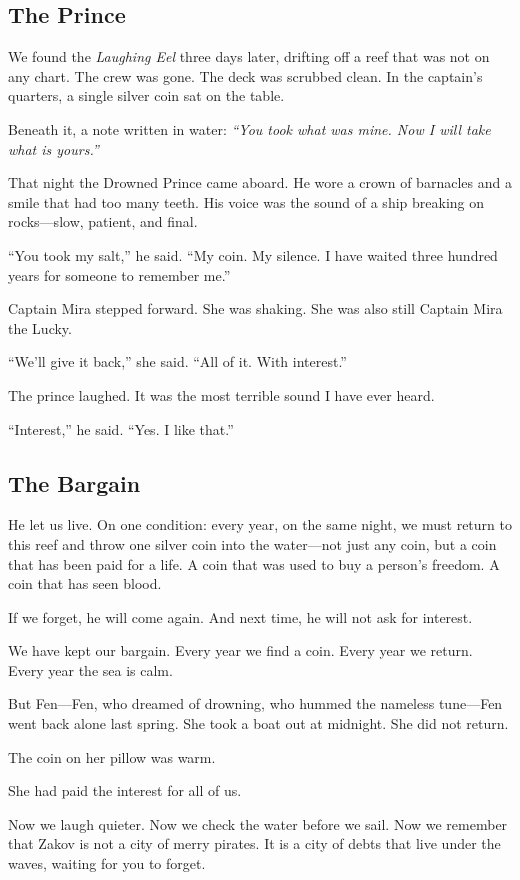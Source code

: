 \documentclass[12pt]{article}
\begin{document}
\subsection*{The Prince}
We found the \textit{Laughing Eel} three days later, drifting off a reef that was not on any chart. The crew was gone. The deck was scrubbed clean. In the captain’s quarters, a single silver coin sat on the table.

Beneath it, a note written in water: \textit{“You took what was mine. Now I will take what is yours.”}

That night the Drowned Prince came aboard. He wore a crown of barnacles and a smile that had too many teeth. His voice was the sound of a ship breaking on rocks—slow, patient, and final.

“You took my salt,” he said. “My coin. My silence. I have waited three hundred years for someone to remember me.”

Captain Mira stepped forward. She was shaking. She was also still Captain Mira the Lucky.

“We’ll give it back,” she said. “All of it. With interest.”

The prince laughed. It was the most terrible sound I have ever heard.

“Interest,” he said. “Yes. I like that.”

\subsection*{The Bargain}
He let us live. On one condition: every year, on the same night, we must return to this reef and throw one silver coin into the water—not just any coin, but a coin that has been paid for a life. A coin that was used to buy a person's freedom. A coin that has seen blood.

If we forget, he will come again. And next time, he will not ask for interest.

We have kept our bargain. Every year we find a coin. Every year we return. Every year the sea is calm.

But Fen—Fen, who dreamed of drowning, who hummed the nameless tune—Fen went back alone last spring. She took a boat out at midnight. She did not return.

The coin on her pillow was warm.

She had paid the interest for all of us.

Now we laugh quieter. Now we check the water before we sail. Now we remember that Zakov is not a city of merry pirates. It is a city of debts that live under the waves, waiting for you to forget.
\end{document}
